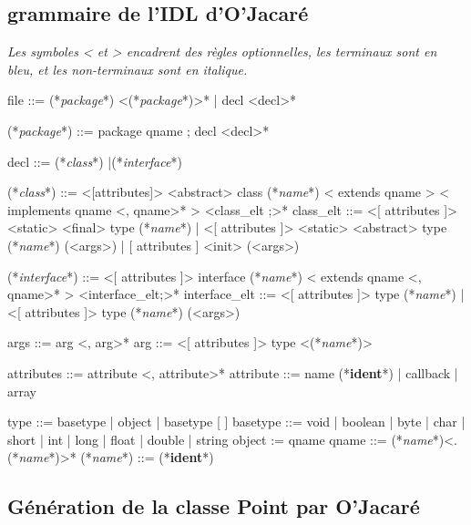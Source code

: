 \documentclass[a4paper, 11pt]{article}
\newcommand{\class}{\ttfamily\textit{class}}
\newcommand{\interface}{\ttfamily\textit{interface}}
\newcommand{\name}{\ttfamily\textit{name}}
\newcommand{\package}{\ttfamily\textit{package}}
\newcommand{\ident}{\footnotesize\textbf{ident}}
\begin{document}
\subsection{grammaire de l'IDL d'O'Jacaré}\label{4.1}

\emph{Les symboles < et > encadrent des règles optionnelles,
les terminaux sont en bleu, et les non-terminaux sont en italique.}

\begin{idl}
file ::= (*\package*) <(*\package*)>*
  	| decl <decl>*
 
(*\package*) ::= package qname ; decl <decl>*

decl ::= (*\class*)
  	|(*\interface*)
 
(*\class*) ::= <[attributes]> <abstract> class (*\name*)
  	  < extends qname >
  	  < implements qname <, qname>* >
  	  { <class_elt ;>* }
class_elt ::= <[ attributes ]> <static> <final> type (*\name*)
            | <[ attributes ]> <static> <abstract> type (*\name*) (<args>)
            | [ attributes ] <init> (<args>)
 
(*\interface*) ::= <[ attributes ]> interface (*\name*)
  	       < extends qname <, qname>* >
  	      { <interface_elt;>* }
interface_elt ::= 
     <[ attributes ]> type (*\name*)
   | <[ attributes ]> type (*\name*) (<args>)
 
args ::= arg <, arg>*
arg ::= <[ attributes ]> type <(*\name*)>
 
attributes ::= 	attribute <, attribute>*
attribute ::= name (*\ident*)
  	    | callback
  	    | array
 
type ::= basetype
       | object
       | basetype [ ]
basetype ::= void
           | boolean
           | byte
           | char
           | short
           | int
           | long
           | float
           | double
           | string
object := qname
qname ::= (*\name*)<.(*\name*)>*
(*\name*) ::= (*\ident*)
\end{idl}

\newpage
\subsection{Génération de la classe Point par O'Jacaré}
\end{document}

